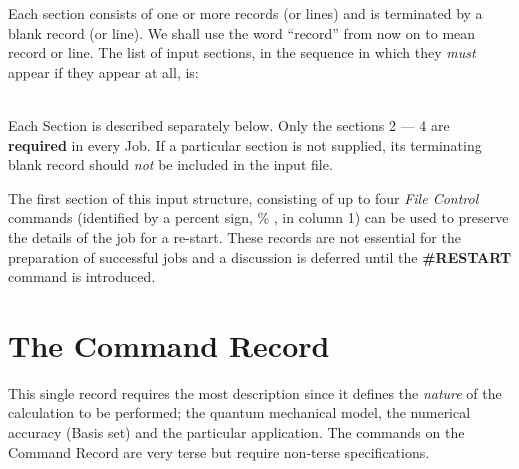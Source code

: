 Each section consists of one or more records (or lines) and is
terminated by a blank record (or line). We shall use the 
word ``record''
from now on to mean record or line. The list of input sections, in the
sequence in which they {\em must} appear if they appear at all, is:
\begin{center}
\end{center}
\ \\
Each Section is described  separately  below.
Only the  sections 2 --- 4 are {\bf required} in every Job. If a
particular section is not supplied, its terminating blank record should
{\em not} be included in the input file.

The first section of this input structure, consisting of up to
four
{\em File Control} commands (identified by a percent sign, \% ,
in column 1) can be used to preserve the
details of the job for a re-start. These records are not essential
for the preparation of successful jobs and a discussion is deferred
until the {\bf \#RESTART} command is introduced.
\section{\sf The Command Record}
\label{commands}
This single record requires the most description since it
defines the {\em nature} of the calculation to be performed; the
quantum mechanical model, the numerical accuracy (Basis set)
and the particular application. The commands on the Command Record
are very terse but require non-terse specifications.

